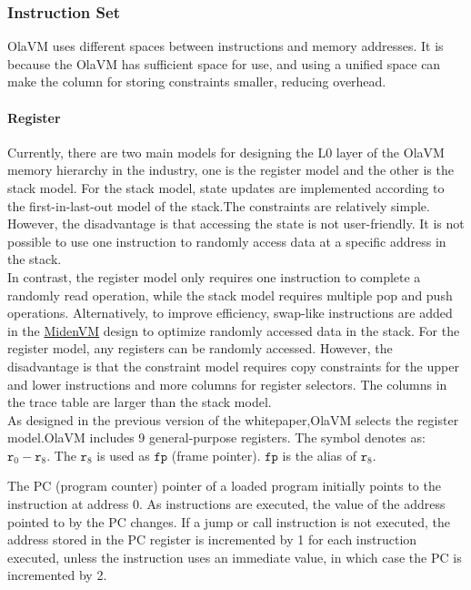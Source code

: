 \subsubsection{Instruction Set} \label{subsec: instructions-set}

OlaVM uses different spaces between instructions and memory addresses.
It is because the OlaVM has sufficient space for use,
and using a unified space can make the column for storing constraints smaller, reducing overhead.


\paragraph*{Register}

Currently, there are two main models for designing the L0 layer of the OlaVM memory hierarchy in the industry, one is the register model and the other is the stack model.
For the stack model, state updates are implemented according to the first-in-last-out model of the stack.The constraints are relatively simple.
However, the disadvantage is that accessing the state is not user-friendly.
It is not possible to use one instruction to randomly access data at a specific address in the stack. \\
In contrast, the register model only requires one instruction to complete a randomly read operation, while the stack model requires multiple pop and push operations.
Alternatively, to improve efficiency, swap-like instructions are added in the \href{https://github.com/0xPolygonMiden/miden-vm}{MidenVM} design to optimize randomly accessed data in the stack.
For the register model, any registers can be randomly accessed.
However, the disadvantage is that the constraint model requires copy constraints for the upper and lower instructions and more columns for register selectors.
The columns in the trace table are larger than the stack model. \\
    As designed in the previous version of the whitepaper,OlaVM selects the register model.OlaVM includes 9 general-purpose registers.
The symbol denotes as: $\texttt{r}_0 - \texttt{r}_8$.
The $\texttt{r}_{8}$ is used as $\texttt{fp}$ (frame pointer). $\texttt{fp}$ is the alias of $\texttt{r}_{8}$.

The PC (program counter) pointer of a loaded program initially points to the instruction at address 0.
As instructions are executed, the value of the address pointed to by the PC changes.
If a jump or call instruction is not executed, the address stored in the PC register is incremented by 1 for each instruction executed, unless the instruction uses an immediate value, in which case the PC is incremented by 2.

